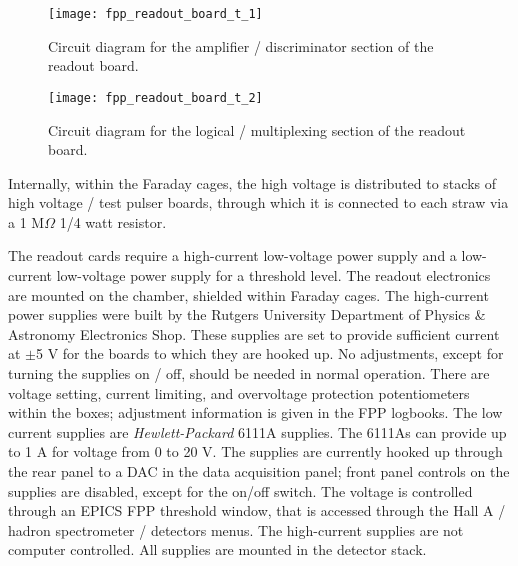 \begin{figure}
\begin{center}
\texttt{[image: fpp\_readout\_board\_t\_1]}
{\linespread{1.}
\caption[Detectors: FPP Readout Board]{Circuit diagram for the
amplifier / discriminator section of the readout board.}
\label{fig:readoutboard1}}
\end{center}
\end{figure}

\begin{figure}
\begin{center}
\texttt{[image: fpp\_readout\_board\_t\_2]}
{\linespread{1.}
\caption[Detectors: FPP Readout Board]{Circuit diagram for the
logical / multiplexing section of the readout board.}
\label{fig:readoutboard2}}
\end{center}
\end{figure}
Internally, within the Faraday cages, the high voltage is distributed to
stacks of high voltage / test pulser boards, through which it is connected to
each straw via a 1 M$\Omega$ 1/4 watt resistor.

The readout cards require a high-current low-voltage
power supply and a low-current low-voltage power
supply for a threshold level.
The readout electronics are mounted on the chamber, shielded
within Faraday cages.
The high-current power supplies were built by the Rutgers University
Department of Physics \& Astronomy Electronics Shop.
These supplies are set to provide sufficient current at $\pm$5 V for the
boards to which they are hooked up.
No adjustments, except for turning the supplies on / off, should be needed
in normal operation.
There are voltage setting, current limiting, and overvoltage protection
potentiometers within the boxes; adjustment information is given in the
FPP logbooks.
The low current supplies are {\em Hewlett-Packard} 6111A supplies.
The 6111As can provide up to 1 A for voltage from 0 to 20 V.
The supplies are currently hooked up through the rear panel to a DAC in
the data acquisition panel; front panel controls on the supplies are
disabled, except for the on/off switch.
The voltage is controlled through an EPICS FPP threshold window, that
is accessed through the Hall A / hadron spectrometer / detectors menus.
The high-current supplies are not computer controlled.
All supplies are mounted in the detector stack.

